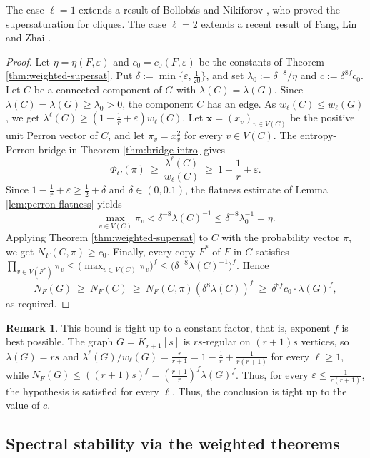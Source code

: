 \documentclass[11pt, a4paper]{article}
\theoremstyle{definition}
\newtheorem{remark}{Remark}
\theoremstyle{plain}
\renewcommand{\le}{\leqslant}
\renewcommand{\ge}{\geqslant}
\begin{document}
The case $\ell =1$ extends a result of Bollob\'{a}s and Nikiforov \cite{BN2007}, who proved the supersaturation for cliques.  
The case $\ell =2$ extends a recent result of Fang, Lin and Zhai \cite[Theorem 1.2]{FLZ2026}. 



\begin{proof}
Let $\eta =\eta (F,\varepsilon )$ and $c_0=c_0(F,\varepsilon )$ be the constants
of Theorem \ref{thm:weighted-supersat}. 
Put
$\delta :=\min\{\varepsilon ,\tfrac1{20}\}$, 
and set
$\lambda_0:=\delta^{-8} /\eta$ and $c:=\delta^{8f}c_0$. Let $C$ be a connected component of $G$
with $\lambda (C)=\lambda (G)$. Since
$\lambda (C)=\lambda (G)\ge \lambda_0>0$, the component $C$ has an
edge. As $w_\ell (C)\le w_\ell (G)$, we get
$\lambda^{\ell}(C)\ge (1-\frac1r+\varepsilon )w_\ell (C)$. Let $\bm{x}=(x_v)_{v\in V(C)}$ be
the positive unit Perron vector of $C$, and let $\pi_v=x_v^2$ for every $v\in V(C)$. 
The entropy-Perron bridge in Theorem
\ref{thm:bridge-intro} gives
\[
  \Phi_C(\pi )\ \ge\ \frac{\lambda^{\ell}(C)}{w_\ell (C)}
  \ \ge\ 1-\frac1r+\varepsilon .
\] 
Since $1-\frac1r+\varepsilon \ge \frac12+\delta$ and
$\delta \in (0,0.1)$, the flatness estimate of Lemma \ref{lem:perron-flatness} yields
$$\max_{v\in V(C)}\pi_v< \delta^{-8}\lambda (C)^{-1} \le \delta^{-8}\lambda_0^{-1}=\eta.$$
 Applying Theorem
\ref{thm:weighted-supersat} to $C$ with the probability vector $\pi$, we get 
$N_F(C,\pi )\ge c_0$. Finally, every copy $F^*$ of $F$ in $C$ satisfies
$\prod_{v\in V(F^*)}\pi_v\le \bigl(\max_{v\in V(C)}\pi_v\bigr)^{f}
 \le \bigl(\delta^{-8}\lambda (C)^{-1}\bigr)^{f}$. Hence
\[
  N_F(G)\ \ge\ N_F(C)\ \ge\
  N_F(C,\pi )\left(\delta^8{\lambda (C)}\right)^{f}
  \ \ge\ \delta^{8f}c_0  \cdot \lambda (G)^{f},
\]
as required.
\end{proof}

\begin{remark}
This bound is tight up to a constant factor, that is, exponent $f$ is best possible. The graph $G=K_{r+1}[s]$ is
$rs$-regular on $(r+1)s$ vertices, so $\lambda (G)=rs$ and
$\lambda^{\ell}(G)/w_\ell (G)=\frac{r}{r+1}
=1-\frac1r+\frac{1}{r(r+1)}$ for every $\ell \ge 1$, while
$N_F(G)\le ((r+1)s)^{f}=(\frac{r+1}{r})^{f}\lambda (G)^{f}$.
Thus, for every $\varepsilon \le \frac{1}{r(r+1)}$, the hypothesis is satisfied
for every $\ell$. Thus, the conclusion is tight up to the value of $c$. 
\end{remark}


\subsection{Spectral stability via the weighted theorems}
\label{subsec:stability-app}
\end{document}
